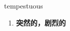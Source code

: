 
\begin{frame}
{\huge tempestuous}
\begin{center}
\begin{enumerate}\Large
  \item \textbf{突然的，剧烈的}
\end{enumerate}
\end{center}
\end{frame}
